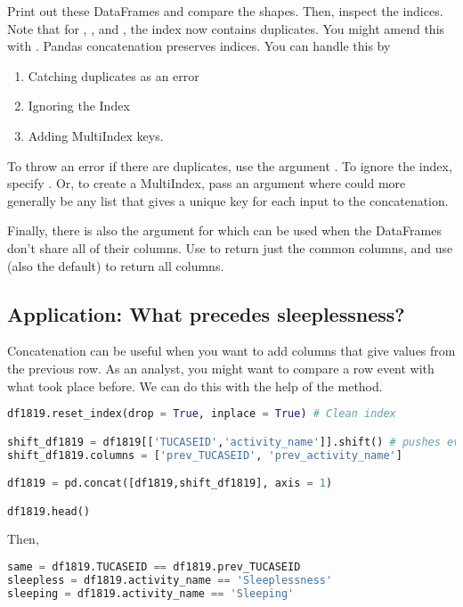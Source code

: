 Print out these DataFrames and compare the shapes. Then, inspect the indices. Note that for , , and , the index now contains duplicates. You might amend this with . Pandas concatenation preserves indices. You can handle this by 
\begin{enumerate}
    \item Catching duplicates as an error
    \item Ignoring the Index
    \item Adding MultiIndex keys.
\end{enumerate}

To throw an error if there are duplicates, use the argument . To ignore the index, specify . Or, to create a MultiIndex, pass an argument  where  could more generally be any list that gives a unique key for each input to the concatenation.

Finally, there is also the  argument for  which can be used when the DataFrames don't share all of their columns. Use  to return just the common columns, and use  (also the default) to return all columns. 

\subsection{Application: What precedes sleeplessness?}

Concatenation can be useful when you want to add columns that give values from the previous row. As an analyst, you might want to compare a row event with what took place before. We can do this with the help of the  method.

\begin{lstlisting}[language = Python]
df1819.reset_index(drop = True, inplace = True) # Clean index

shift_df1819 = df1819[['TUCASEID','activity_name']].shift() # pushes every row forward by default
shift_df1819.columns = ['prev_TUCASEID', 'prev_activity_name']

df1819 = pd.concat([df1819,shift_df1819], axis = 1)

df1819.head()
\end{lstlisting}

Then,

\begin{lstlisting}[language = Python]
same = df1819.TUCASEID == df1819.prev_TUCASEID
sleepless = df1819.activity_name == 'Sleeplessness'
sleeping = df1819.activity_name == 'Sleeping'
\end{lstlisting}

